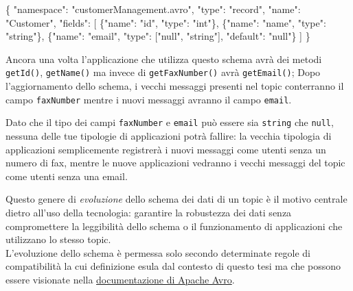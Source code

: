 \documentclass[]{article}
\newenvironment{Shaded}{}{}
\newcommand{\DataTypeTok}[1]{\textcolor[rgb]{0.56,0.13,0.00}{#1}}
\newcommand{\StringTok}[1]{\textcolor[rgb]{0.25,0.44,0.63}{#1}}
\newcommand{\OtherTok}[1]{\textcolor[rgb]{0.00,0.44,0.13}{#1}}
\newcommand{\FunctionTok}[1]{\textcolor[rgb]{0.02,0.16,0.49}{#1}}
\begin{document}
\begin{Shaded}
\begin{Highlighting}[]
\FunctionTok{\{}
    \DataTypeTok{"namespace"}\FunctionTok{:} \StringTok{"customerManagement.avro"}\FunctionTok{,}
    \DataTypeTok{"type"}\FunctionTok{:} \StringTok{"record"}\FunctionTok{,}
    \DataTypeTok{"name"}\FunctionTok{:} \StringTok{"Customer"}\FunctionTok{,}
    \DataTypeTok{"fields"}\FunctionTok{:} \OtherTok{[}
         \FunctionTok{\{}\DataTypeTok{"name"}\FunctionTok{:} \StringTok{"id"}\FunctionTok{,} \DataTypeTok{"type"}\FunctionTok{:} \StringTok{"int"}\FunctionTok{\}}\OtherTok{,}
         \FunctionTok{\{}\DataTypeTok{"name"}\FunctionTok{:} \StringTok{"name"}\FunctionTok{,}  \DataTypeTok{"type"}\FunctionTok{:} \StringTok{"string"}\FunctionTok{\}}\OtherTok{,}
         \FunctionTok{\{}\DataTypeTok{"name"}\FunctionTok{:} \StringTok{"email"}\FunctionTok{,} \DataTypeTok{"type"}\FunctionTok{:} \OtherTok{[}\StringTok{"null"}\OtherTok{,} \StringTok{"string"}\OtherTok{]}\FunctionTok{,} \DataTypeTok{"default"}\FunctionTok{:} \StringTok{"null"}\FunctionTok{\}}
    \OtherTok{]} 
\FunctionTok{\}}
\end{Highlighting}
\end{Shaded}

\normalsize

Ancora una volta l'applicazione che utilizza questo schema avrà dei
metodi \texttt{getId()}, \texttt{getName()} ma invece di
\texttt{getFaxNumber()} avrà \texttt{getEmail()}; Dopo l'aggiornamento
dello schema, i vecchi messaggi presenti nel topic conterranno il campo
\texttt{faxNumber} mentre i nuovi messaggi avranno il campo
\texttt{email}.

Dato che il tipo dei campi \texttt{faxNumber} e \texttt{email} può
essere sia \texttt{string} che \texttt{null}, nessuna delle tue
tipologie di applicazioni potrà fallire: la vecchia tipologia di
applicazioni semplicemente registrerà i nuovi messaggi come utenti senza
un numero di fax, mentre le nuove applicazioni vedranno i vecchi
messaggi del topic come utenti senza una email.

Questo genere di \emph{evoluzione} dello schema dei dati di un topic è
il motivo centrale dietro all'uso della tecnologia: garantire la
robustezza dei dati senza compromettere la leggibilità dello schema o il
funzionamento di applicazioni che utilizzano lo stesso topic.\\
L'evoluzione dello schema è permessa solo secondo determinate regole di
compatibilità la cui definizione esula dal contesto di questo tesi ma
che possono essere visionate nella
\href{https://avro.apache.org/docs/1.7.7/spec.html\#Schema+Resolution}{documentazione
di Apache Avro}.
\end{document}
